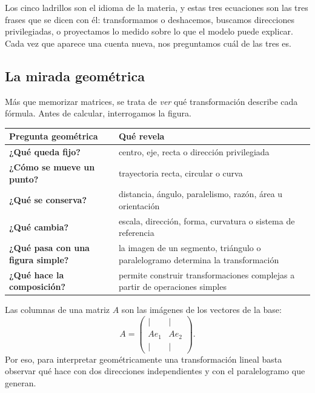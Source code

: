 \begin{resultado}[Las tres ecuaciones maestras de la materia (\(Ax=b\), \(Ax=\lambda x\), \(Ax\approx b\))]
\smallskip
Los cinco ladrillos son el idioma de la materia, y estas tres ecuaciones son las tres frases que se dicen con él: transformamos o deshacemos, buscamos direcciones privilegiadas, o proyectamos lo medido sobre lo que el modelo puede explicar. Cada vez que aparece una cuenta nueva, nos preguntamos cuál de las tres es.
\end{resultado}

\subsection{La mirada geométrica}

Más que memorizar matrices, se trata de \emph{ver} qué transformación describe cada fórmula.
Antes de calcular, interrogamos la figura.

\begin{center}
\begin{tabularx}{\textwidth}{>{\bfseries}p{38mm} X}
\toprule
Pregunta geométrica & Qué revela\\
\midrule
¿Qué queda fijo? & centro, eje, recta o dirección privilegiada\\
¿Cómo se mueve un punto? & trayectoria recta, circular o curva\\
¿Qué se conserva? & distancia, ángulo, paralelismo, razón, área u orientación\\
¿Qué cambia? & escala, dirección, forma, curvatura o sistema de referencia\\
¿Qué pasa con una figura simple? & la imagen de un segmento, triángulo o paralelogramo
determina la transformación\\
¿Qué hace la composición? & permite construir transformaciones complejas a partir de
operaciones simples\\
\bottomrule
\end{tabularx}
\end{center}

\begin{resultado}
Las columnas de una matriz \(A\) son las imágenes de los vectores de la base:
\[
  A=
  \begin{pmatrix}\vert&\vert\\Ae_1&Ae_2\\\vert&\vert\end{pmatrix}.
\]
Por eso, para interpretar geométricamente una transformación lineal basta observar qué hace
con dos direcciones independientes y con el paralelogramo que generan.
\end{resultado}


